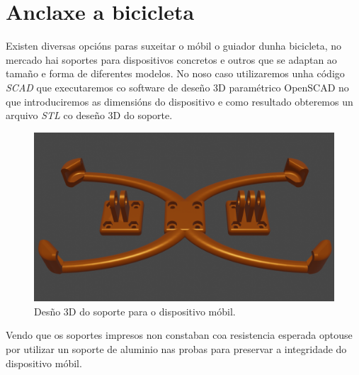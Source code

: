 \section{Anclaxe a bicicleta}
Existen diversas opcións paras suxeitar o móbil o guiador dunha bicicleta, no mercado hai soportes para dispositivos concretos e outros que se adaptan ao tamaño e forma de diferentes modelos. No noso caso utilizaremos unha código \emph{SCAD} que executaremos co software de deseño 3D paramétrico OpenSCAD no que introduciremos as dimensións do dispositivo e como resultado obteremos un arquivo \emph{STL} co deseño 3D do soporte.
\begin{figure}[tb]
  \centering
  \includegraphics[scale=.2]{imaxes/soporte-mobil.png}
  \caption{Desño 3D do soporte para o dispositivo móbil.}
  \label{f:soporte móbil}
\end{figure}
Vendo que os soportes impresos non constaban coa resistencia esperada optouse por utilizar un soporte de aluminio nas probas para preservar a integridade do dispositivo móbil.
